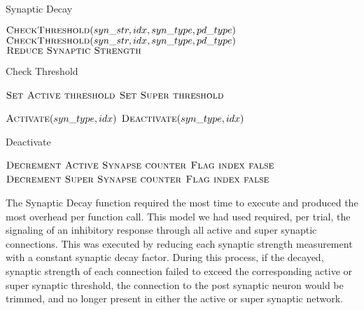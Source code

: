 \documentclass[a4paper]{article}
\begin{document}
\begin{algorithm}[H]
\caption{Synaptic Decay}
\label{alg:decay}
\begin{algorithmic}
	\State $\textsc{CheckThreshold}(syn\_str, idx, syn\_type, pd\_type)$
	\State $\textsc{CheckThreshold}(syn\_str, idx, syn\_type, pd\_type)$
	\State $\textsc{Reduce Synaptic Strength}$
\EndFor
\end{algorithmic}
\end{algorithm}

\begin{algorithm}[H]
\caption{Check Threshold}
\label{alg:check}
\begin{algorithmic}
	\State $\textsc{Set Active threshold}$
	\State $\textsc{Set Super threshold}$
\EndIf

	\State $\textsc{Activate}(syn\_type, idx)$
	\State $\textsc{Deactivate}(syn\_type, idx)$
\EndIf
\end{algorithmic}
\end{algorithm}

\begin{algorithm}[H]
\caption{Deactivate}
\label{alg:deactivate}
\begin{algorithmic}
	\State $\textsc{Decrement Active Synapse counter}$
	\State $\textsc{Flag index false}$
	\State $\textsc{Decrement Super Synapse counter}$
	\State $\textsc{Flag index false}$
\EndIf
\end{algorithmic}
\end{algorithm}

The Synaptic Decay function required the most time to execute and produced the most overhead per function call. This model we had used required, per trial, the signaling of an inhibitory response through all active and super synaptic connections. This was executed by reducing each synaptic strength measurement with a constant synaptic decay factor. During this process, if the decayed, synaptic strength of each connection failed to exceed the corresponding active or super synaptic threshold, the connection to the post synaptic neuron would be trimmed, and no longer present in either the active or super synaptic network.
\end{document}
